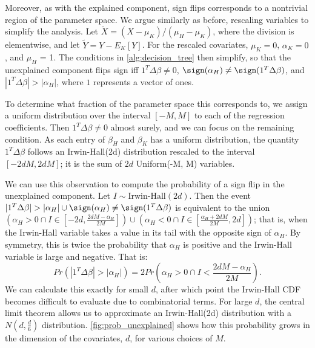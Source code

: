 Moreover, as with the explained component, sign flips corresponds to a nontrivial region of the parameter space.
We argue similarly as before, rescaling variables to simplify the analysis.
Let \( \tilde{X} = (X - \mu_K) / (\mu_H - \mu_K) \), where the division is elementwise, and let \( \tilde{Y} = Y - E_K[Y] \).
For the rescaled covariates, \( \mu_K = 0\), \( \alpha_K = 0 \), and \( \mu_H \) = 1.
The conditions in \cref{alg:decision_tree} then simplify, so that the unexplained component flips sign iff \( 1^T \Delta \beta \neq 0 \), \( \sign (\alpha_H) \neq \sign (1^T \Delta \beta) \), and \( | 1^T \Delta \beta | > |\alpha_H| \), where \( 1 \) represents a vector of ones.

To determine what fraction of the parameter space this corresponds to, we assign a uniform distribution over the interval \( [-M, M] \) to each of the regression coefficients.
Then \( 1^T \Delta \beta \neq 0 \) almost surely, and we can focus on the remaining condition.
As each entry of \( \beta_H \) and \( \beta_K \) has a uniform distribution, the quantity \( 1^T \Delta \beta \) follows an Irwin-Hall(2d) distribution rescaled to the interval \( [-2dM, 2dM] \); it is the sum of \(2d\) Uniform(-M, M) variables.

We can use this observation to compute the probability of a sign flip in the unexplained component.
Let \( I \sim \text{Irwin-Hall}(2d) \).
Then the event \( | 1^T \Delta \beta | > |\alpha_H| \cup \sign (\alpha_H) \neq \sign (1^T \Delta \beta) \) is equivalent to the union \( (\alpha_H > 0 \cap I \in [-2d, \frac{2dM - \alpha_H}{2M}]) \cup (\alpha_H < 0 \cap I \in [\frac{\alpha_H + 2dM}{2M}, 2d] ) \); that is, when the Irwin-Hall variable takes a value in its tail with the opposite sign of \( \alpha_H \).
By symmetry, this is twice the probability that \( \alpha_H \) is positive and the Irwin-Hall variable is large and negative.
That is:
\[ Pr(| 1^T \Delta \beta | > |\alpha_H|) = 2 Pr(\alpha_H > 0 \cap I < \frac{2dM - \alpha_H}{2M}). \] 
We can calculate this exactly for small \( d \), after which point the Irwin-Hall CDF becomes difficult to evaluate due to combinatorial terms.
For large \( d \), the central limit theorem allows us to approximate an Irwin-Hall(2d) distribution with a \( N(d, \frac{d}{6})\) distribution.
\cref{fig:prob_unexplained} shows how this probability grows in the dimension of the covariates, \( d \), for various choices of \( M \).


